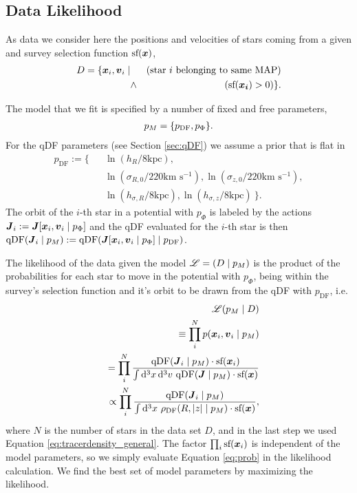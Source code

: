 \subsection{Data Likelihood} \label{sec:likelihood}

As data we consider here the positions and velocities of stars coming from a given \MAP{} and survey selection function $\text{sf}(\boldsymbol{x})$,
\begin{eqnarray*}
D  =\{ \boldsymbol{x}_i,\boldsymbol{v}_i \mid && \text{(star $i$ belonging to same MAP{})}\nonumber\\
&\wedge& (\text{sf}(\boldsymbol{x_i}) > 0) \}.
\end{eqnarray*}

The model that we fit is specified by a number of fixed and free parameters,
\begin{eqnarray*}
p_M =\{ p_\text{DF} , p_\Phi \}.
\end{eqnarray*}
For the qDF parameters (see Section \ref{sec:qDF}) we assume a prior that is flat in
\begin{eqnarray*}
p_\text{DF} := \{&& \ln \left(h_R/8\text{kpc}\right), \\
&& \ln \left(\sigma_{R,0}/220\text{km s$^{-1}$}\right), \ln \left(\sigma_{z,0}/220\text{km s$^{-1}$}\right), \\
&& \ln \left(h_{\sigma,R}/8\text{kpc}\right), \ln \left(h_{\sigma,z}/8\text{kpc}\right)\ \}.
\end{eqnarray*}
The orbit of the $i$-th star in a potential with $p_\Phi$ is labeled by the actions $\boldsymbol{J}_i := \boldsymbol{J}[\boldsymbol{x}_i,\boldsymbol{v}_i\mid p_{\Phi}]$ and the qDF evaluated for the $i$-th star is then $\text{qDF}(\boldsymbol{J}_i \mid p_M) := \text{qDF}(\boldsymbol{J}[\boldsymbol{x}_i,\boldsymbol{v}_i\mid p_{\Phi}] \mid p_\text{DF})$.

The likelihood of the data given the model $\mathscr{L} = (D \mid p_M)$ is the product of the probabilities for each star to move in the potential with $p_\Phi$, being within the survey's selection function and it's orbit to be drawn from the qDF with $p_\text{DF}$, i.e. 
\begin{eqnarray}
&&\mathscr{L}(p_M \mid D) \nonumber\\
&&\equiv \prod_i^{N} p(\boldsymbol{x}_i,\boldsymbol{v}_i \mid p_M) \nonumber\\
&&= \prod_i^{N} \frac{\text{qDF}(\boldsymbol{J}_i \mid p_M) \cdot \text{sf}(\boldsymbol{x}_i)}{\int \mathop{}\!\mathrm{d^3} x \mathop{}\!\mathrm{d^3} v \  \text{qDF}(\boldsymbol{J} \mid p_M) \cdot \text{sf}(\boldsymbol{x})}\nonumber\\
&&\propto \prod_i^{N} \frac{\text{qDF}(\boldsymbol{J}_i \mid p_M)}{\int \mathop{}\!\mathrm{d^3} x \  \rho_\text{DF}(R,|z| \mid p_M) \cdot \text{sf}(\boldsymbol{x})}, \label{eq:prob}
\end{eqnarray}
where $N$ is the number of stars in the data set $D$, and in the last step we used Equation \ref{eq:tracerdensity_general}. The factor $\prod_i\text{sf}(\boldsymbol{x}_i)$ is independent of the model parameters, so we  simply evaluate Equation \ref{eq:prob} in the likelihood calculation. We find the best set of model parameters by maximizing the likelihood.\\

